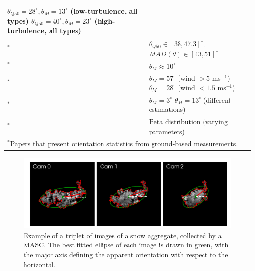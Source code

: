 \documentclass[draft]{agujournal2019}
\begin{document}
\begin{table}
\begin{tabular}{l p{80mm}}
   $\theta_{Q50} = 28^\circ, \theta_{M} = 13^\circ$ (low-turbulence, all types) \newline
   $\theta_{Q50}= 40^\circ, \theta_{M} = 23^\circ$ (high-turbulence, all types) \\
   \hline
   \cite{Gergely_JGRA_2016}$^*$ &  $\theta_{Q50} \in [38,47.3]^\circ$, $MAD(\theta) \in [43,51]^\circ$ \\
   \hline
   \cite{Jiang_JAS_2019}$^*$ & $\theta_{M}\approx 10^\circ$ \\
   \hline
   \cite{Fitch_AMT_2021}$^*$ & $\theta_{M} = 57^\circ$ (wind $> 5$ ms$^{-1}$) \newline
   $\theta_{M} = 28^\circ$ (wind $< 1.5$ ms$^{-1}$) \\
   \hline
   \cite{Fitch_JGR_2022}$^*$ & $\theta_{M} = 3^\circ$ 
   \newline
   $\theta_{M} = 13^\circ$ (different estimations)  \\
   \hline
   \cite{Schrom_JAS_2023}$^*$ & Beta distribution (varying parameters) \\
   \hline
    \multicolumn{2}{l}{$^{*}$Papers that present orientation statistics from ground-based measurements.}
 \end{tabular}
 \end{table}


\begin{figure}
 \noindent\includegraphics[width=\textwidth]{Fig01.png}
\caption{Example of a triplet of images of a snow aggregate, collected by a MASC. The best fitted ellipse of each image is drawn in green, with the major axis defining the apparent orientation with respect to the horizontal.    }
\label{fig:triplet}
\end{figure}
\end{document}
